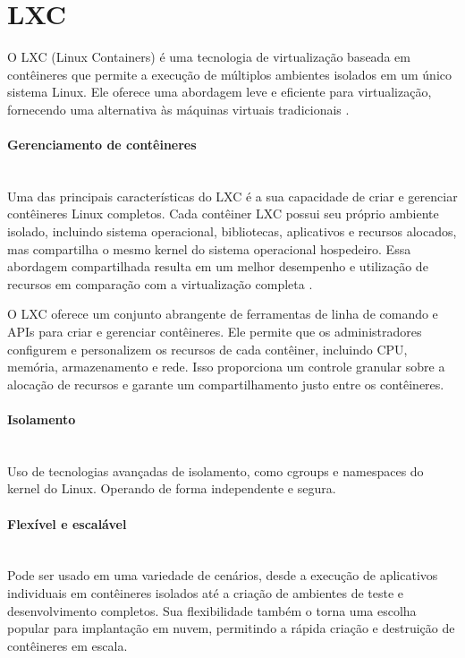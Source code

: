 \section{LXC}

O LXC (Linux Containers) é uma tecnologia de virtualização baseada em contêineres que permite a execução de múltiplos ambientes isolados em um único sistema Linux. Ele oferece uma abordagem leve e eficiente para virtualização, fornecendo uma alternativa às máquinas virtuais tradicionais \cite{lxc-docs}.

\paragraph*{Gerenciamento de contêineres}\mbox{}\\

Uma das principais características do LXC é a sua capacidade de criar e gerenciar contêineres Linux completos. Cada contêiner LXC possui seu próprio ambiente isolado, incluindo sistema operacional, bibliotecas, aplicativos e recursos alocados, mas compartilha o mesmo kernel do sistema operacional hospedeiro. Essa abordagem compartilhada resulta em um melhor desempenho e utilização de recursos em comparação com a virtualização completa \cite{lxc-docs, container-security}.

O LXC oferece um conjunto abrangente de ferramentas de linha de comando e APIs para criar e gerenciar contêineres. Ele permite que os administradores configurem e personalizem os recursos de cada contêiner, incluindo CPU, memória, armazenamento e rede. Isso proporciona um controle granular sobre a alocação de recursos e garante um compartilhamento justo entre os contêineres.

\paragraph*{Isolamento}\mbox{}\\
 Uso de tecnologias avançadas de isolamento, como cgroups e namespaces do kernel do Linux. Operando de forma independente e segura.


\paragraph*{Flexível e escalável}\mbox{}\\
 Pode ser usado em uma variedade de cenários, desde a execução de aplicativos individuais em contêineres isolados até a criação de ambientes de teste e desenvolvimento completos. Sua flexibilidade também o torna uma escolha popular para implantação em nuvem, permitindo a rápida criação e destruição de contêineres em escala.

